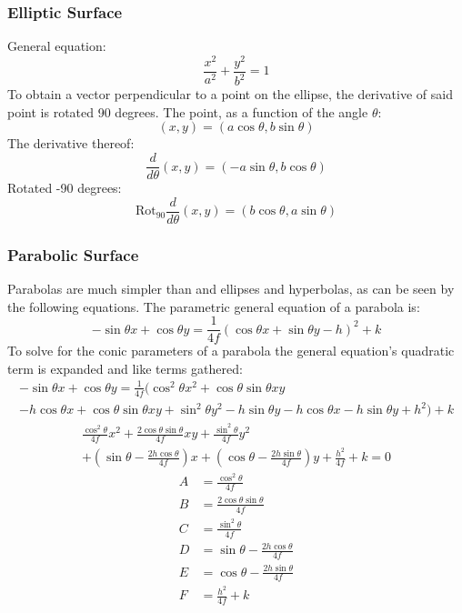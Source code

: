 \subsubsection{Elliptic Surface}
General equation:
\begin{equation}
	\frac{x^2}{a^2} + \frac{y^2}{b^2} = 1
\end{equation}
To obtain a vector perpendicular to a point on the ellipse, the derivative of said point is rotated 90 degrees.
The point, as a function of the angle $\theta$:
\begin{equation}
	(x,y) = (a\cos\theta, b\sin\theta)
\end{equation}
The derivative thereof:
\begin{equation}
	\frac{d}{d\theta}(x,y) = (-a\sin\theta, b\cos\theta)
\end{equation}
Rotated -90 degrees:
\begin{equation}
	\text{Rot}_{90}\frac{d}{d\theta}(x,y) = (b\cos\theta, a\sin\theta)
\end{equation}

\subsubsection{Parabolic Surface}
Parabolas are much simpler than and ellipses and hyperbolas, as can be seen by the following equations.
The parametric general equation of a parabola is:
\begin{equation}
	-\sin\theta x + \cos\theta y = \frac{1}{4f}(\cos\theta x + \sin\theta y - h)^2 + k
\end{equation}
To solve for the conic parameters of a parabola the general equation's quadratic term is expanded and like terms gathered:
\begin{multline*}
	-\sin\theta x + \cos\theta y = \frac{1}{4f}(\cos^2\theta x^2 + \cos\theta\sin\theta xy \\
	- h \cos\theta x + \cos\theta\sin\theta xy + \sin^2\theta y^2 - h\sin\theta y - h \cos\theta x - h \sin\theta y + h^2) + k
\end{multline*}
\begin{multline*}
	\frac{\cos^2\theta}{4f} x^2 + \frac{2\cos\theta\sin\theta}{4f} xy + \frac{\sin^2\theta}{4f} y^2 \\
	+ \left(\sin\theta - \frac{2h \cos\theta}{4f}\right)x + \left(\cos\theta - \frac{2h \sin\theta}{4f}\right)y + \frac{h^2}{4f} + k = 0
\end{multline*}
\begin{align}
	A &= \frac{\cos^2\theta}{4f} \\
	B &= \frac{2\cos\theta\sin\theta}{4f} \\
	C &= \frac{\sin^2\theta}{4f} \\
	D &= \sin\theta - \frac{2h \cos\theta}{4f} \\
	E &= \cos\theta - \frac{2h \sin\theta}{4f} \\
	F &= \frac{h^2}{4f} + k
\end{align}

